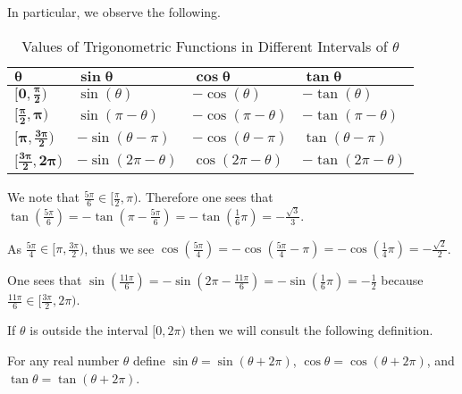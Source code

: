 In particular, we observe the following.
\begin{table}[H]
    \centering
    \begin{tabular}{|l|l|l|l|}
        \hline
        $\boldsymbol{\theta}$ & $\boldsymbol{\sin\theta}$ & $\boldsymbol{\cos\theta}$ & $\boldsymbol{\tan\theta}$ \\ \hline
        $\boldsymbol{[0,\frac\pi2)}$ & $\sin(\theta)$ & $-\cos(\theta)$ & $-\tan(\theta)$ \\ \hline
        $\boldsymbol{[\frac\pi2, \pi)}$ & $\sin(\pi-\theta)$ & $-\cos(\pi-\theta)$ & $-\tan(\pi-\theta)$ \\ \hline
        $\boldsymbol{[\pi,\frac{3\pi}2)}$ & $-\sin(\theta-\pi)$ & $-\cos(\theta-\pi)$ & $\tan(\theta-\pi)$ \\ \hline
        $\boldsymbol{[\frac{3\pi}2, 2\pi)}$ & $-\sin(2\pi-\theta)$ & $\cos(2\pi-\theta)$ & $-\tan(2\pi-\theta)$ \\ \hline
    \end{tabular}
    \caption{Values of Trigonometric Functions in Different Intervals of $\theta$}
\end{table}

\begin{example}
    We note that $\frac{5\pi}6 \in [\frac\pi2, \pi)$. Therefore one sees that $\tan(\frac{5\pi}{6}) = -\tan(\pi-\frac{5\pi}{6}) = -\tan(\frac16\pi) = -\frac{\sqrt3}3$.
\end{example}

\begin{example}
    As $\frac{5\pi}4 \in [\pi, \frac{3\pi}2)$, thus we see $\cos(\frac{5\pi}4) = -\cos(\frac{5\pi}4-\pi) = -\cos(\frac14\pi) = -\frac{\sqrt2}2$.
\end{example}

\begin{example}
    One sees that $\sin(\frac{11\pi}{6}) = -\sin(2\pi-\frac{11\pi}{6}) = -\sin(\frac16\pi) = -\frac12$ because $\frac{11\pi}{6} \in [\frac{3\pi}2, 2\pi)$.
\end{example}

If $\theta$ is outside the interval $[0, 2\pi)$ then we will consult the following definition.

\begin{definition}
    For any real number $\theta$ define $\sin\theta = \sin(\theta + 2\pi)$, $\cos\theta = \cos(\theta + 2\pi)$, and $\tan\theta = \tan(\theta + 2\pi)$.
\end{definition}



